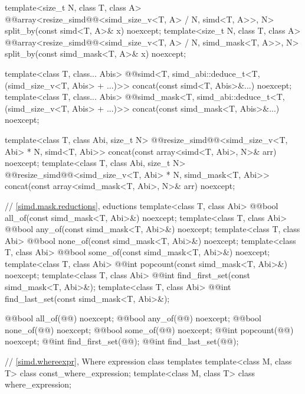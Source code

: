 \begin{codeblock}
{  template<size_t N, class T, class A>
    @@array<resize_simd@@<simd_size_v<T, A> / N, simd<T, A>>, N>
      split_by(const simd<T, A>& x) noexcept;
  template<size_t N, class T, class A>
    @@array<resize_simd@@<simd_size_v<T, A> / N, simd_mask<T, A>>, N>
      split_by(const simd_mask<T, A>& x) noexcept;

  template<class T, class... Abis>
    @@simd<T, simd_abi::deduce_t<T, (simd_size_v<T, Abis> + ...)>>
      concat(const simd<T, Abis>&...) noexcept;
  template<class T, class... Abis>
    @@simd_mask<T, simd_abi::deduce_t<T, (simd_size_v<T, Abis> + ...)>>
      concat(const simd_mask<T, Abis>&...) noexcept;

  template<class T, class Abi, size_t N>
    @@resize_simd@@<simd_size_v<T, Abi> * N, simd<T, Abi>>
      concat(const array<simd<T, Abi>, N>& arr) noexcept;
  template<class T, class Abi, size_t N>
    @@resize_simd@@<simd_size_v<T, Abi> * N, simd_mask<T, Abi>>
      concat(const array<simd_mask<T, Abi>, N>& arr) noexcept;

  // \ref{simd.mask.reductions}, eductions
  template<class T, class Abi> @@bool all_of(const simd_mask<T, Abi>&) noexcept;
  template<class T, class Abi> @@bool any_of(const simd_mask<T, Abi>&) noexcept;
  template<class T, class Abi> @@bool none_of(const simd_mask<T, Abi>&) noexcept;
  template<class T, class Abi> @@bool some_of(const simd_mask<T, Abi>&) noexcept;
  template<class T, class Abi> @@int popcount(const simd_mask<T, Abi>&) noexcept;
  template<class T, class Abi> @@int find_first_set(const simd_mask<T, Abi>&);
  template<class T, class Abi> @@int find_last_set(const simd_mask<T, Abi>&);

  @@bool all_of(@@) noexcept;
  @@bool any_of(@@) noexcept;
  @@bool none_of(@@) noexcept;
  @@bool some_of(@@) noexcept;
  @@int popcount(@@) noexcept;
  @@int find_first_set(@@);
  @@int find_last_set(@@);

  // \ref{simd.whereexpr}, Where expression class templates
  template<class M, class T> class const_where_expression;
  template<class M, class T> class where_expression;

}
\end{codeblock}
